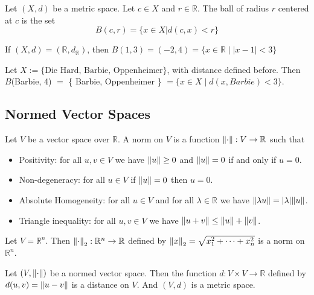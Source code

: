 \begin{definition}
    \label{ball}
    Let $(X,d)$ be a metric space. Let $c \in X$ and $r \in \mathbb{R}$. The ball of radius $r$ centered at $c$ is the set
    $$ B(c,r) = \{ x \in X | d(c,x) < r \} $$
\end{definition}

\begin{example}
    If $(X,d) = (\mathbb{R}, d_\mathbb{R})$, then $B(1,3) = (-2,4) = \{x \in \mathbb{R} \mid |x-1| < 3\}$
\end{example}

\begin{example}
    Let $X := \{\text{Die Hard, Barbie, Oppenheimer}\}$, with distance defined before. 
    Then $B$(Barbie, 4)  $=$ \{ Barbie, Oppenheimer \} $= \{x \in X \mid d(x, Barbie) < 3\}$.
\end{example}

\subsection{Normed Vector Spaces}

\begin{definition}[norm]
    Let $V$ be a vector space over $\mathbb{R}$. A norm on $V$ is a function
    $\norm{ \cdot }: V \to \mathbb{R}$ such that

    \begin{itemize}
        \item Positivity: for all $u,v \in V$ we have $\norm{ u } \geq 0$ and $\norm{ u } = 0$ if and only if $u = 0$.
        \item Non-degeneracy: for all $u \in V$ if $\norm{ u } = 0$ then $u = 0$.
        \item Absolute Homogeneity: for all $u \in V$ and for all $\lambda \in \mathbb{R}$ we have $\norm{ \lambda u } = |\lambda| \norm{ u }$.
        \item Triangle inequality: for all $u,v \in V$ we have $\norm{ u+v } \leq \norm{ u } + \norm{ v }$.
    \end{itemize}
\end{definition}

\begin{example}
    Let $V = \mathbb{R}^n$. Then $\norm{ \cdot }_2: \mathbb{R}^n \to \mathbb{R}$ defined by $\norm{ x }_2 = \sqrt{x_1^2 + \cdots + x_n^2}$ is a norm on $\mathbb{R}^n$.
\end{example}

\begin{proposition}
    Let $(V, \norm{ \cdot })$ be a normed vector space. 
    Then the function $d: V \times V \to \mathbb{R}$ defined by $d(u,v) = \norm{ u-v }$ is a distance on $V$.
    And $(V,d)$ is a metric space.
\end{proposition}

